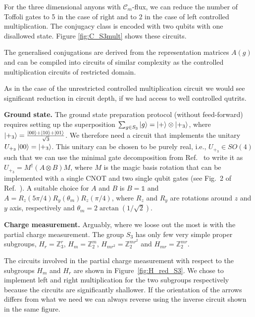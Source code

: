 \documentclass[a4paper,twocolumn,11pt, accepted=2024-06-14]{quantumarticle}
\begin{document}
For the three dimensional anyons with $\mathcal{C}_m$-flux, we can reduce the number of Toffoli gates to 5 in the case of right and to 2 in the case of left controlled multiplication. The conjugacy class is encoded with two qubits with one disallowed state. Figure \ref{fig:C_S3mult} shows these circuits.

The generalised conjugations are derived from the representation matrices $A{(g)}$ and can be compiled into circuits of similar complexity as the controlled multiplication circuits of restricted domain.

As in the case of the unrestricted controlled multiplication circuit we would see significant reduction in circuit depth, if we had access to well controlled qutrits.

\textbf{Ground state.}
The ground state preparation protocol (without feed-forward) requires setting up the superposition $\sum_{g \in S_3} \ket{g}=\ket{+}\otimes \ket{+_3}$, where $\ket{+_3}=\frac{\ket{00}+\ket{10}+\ket{01}}{{\sqrt{3}} }$. We therefore need a circuit that implements the unitary $U_{+_3}\ket{00}= \ket{+_3}$. This unitary can be chosen to be purely real, i.e., $U_{+_3}\in SO(4)$ such that we can use the minimal gate decomposition from Ref.~\cite{decomp} to write it as $U_{+_3}=M^\dag(A\otimes B)M$, where $M$ is the magic basis rotation that can be implemented with a single CNOT and two single qubit gates  (see Fig.~2 of Ref.~\cite{decomp}). A suitable choice for $A$ and $B$ is $B=\mathbb 1$ and $A=R_z(5\pi/4)R_y(\theta_m) R_z(\pi/4)$, where $R_z$ and $R_y$ are rotations around $z$ and $y$ axis, respectively and $\theta_m=2 \arctan(1/\sqrt{2})$. 

\textbf{Charge measurement.}
Arguably, where we loose out the most is with the partial charge measurement. The group $S_3$ has only few very simple proper subgroups, $H_r = \mathbb{Z}_3^r$, $H_m = \mathbb{Z}_2^m$, $H_{mr^2} = \mathbb{Z}_2^{mr^2}$ and $H_{mr} = \mathbb{Z}_2^{mr}$.

The circuits involved in the partial charge measurement with respect to the subgroups $H_m$ and $H_r$ are shown in Figure~\ref{fig:H_red_S3}. We chose to implement left and right multiplication for the two subgroups respectively because the circuits are significantly shallower. If the orientation of the arrows differs from what we need we can always reverse using the inverse circuit shown in the same figure.
\end{document}
